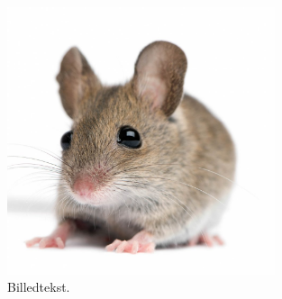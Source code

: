 \documentclass{article}
\begin{document}
\begin{figure}[H] 
\begin{center}
\includegraphics[width=0.7\textwidth]{figures/mus} %
\end{center}
\caption{Billedtekst. \cite{mus}} %
\label{fig:mus} %
\end{figure}

\end{document}
